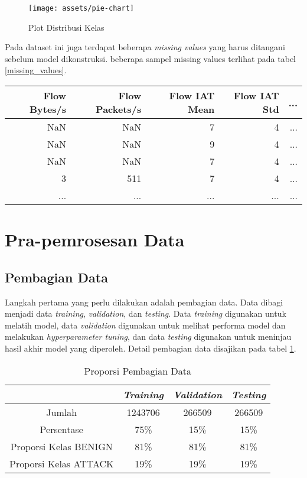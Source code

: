 \documentclass[a4paper,12pt]{report}
\begin{document}
\begin{figure}[H]
	\center \texttt{[image: assets/pie-chart]}
	\caption{Plot Distribusi Kelas} 
	\label{distribusi_kelas}
\end{figure}

Pada dataset ini juga terdapat beberapa \textit{missing values} yang harus ditangani sebelum model dikonstruksi. beberapa sampel missing values terlihat pada tabel \ref{missing_values}.
\begin{table}[h!]
	\centering
	\caption{Sampel data aktivitas jaringan}
	\label{missing_values}
	\begin{longtable}{|r|r|r|r|r|}
		\hline
		Flow Bytes/s & Flow Packets/s  & Flow IAT Mean & Flow IAT Std & ... \\
		\hline
		NaN& NaN & 7 & 4 & ...  \\
		\hline
		NaN & NaN & 9 & 4 & ...  \\
		\hline
		NaN & NaN & 7 & 4 & ... \\
		\hline
		3 & 511 & 7 & 4 & ... \\
		\hline
		... & ... & ... & ... & ... \\
		\hline
	\end{longtable}
\end{table}

\section{Pra-pemrosesan Data}
\subsection{Pembagian Data}
Langkah pertama yang perlu dilakukan adalah pembagian data. Data dibagi menjadi data \textit{training}, \textit{validation}, dan \textit{testing}. Data \textit{training} digunakan untuk melatih model, data \textit{validation} digunakan untuk melihat performa model dan melakukan \textit{hyperparameter tuning}, dan data \textit{testing} digunakan untuk meninjau hasil akhir model yang diperoleh. Detail pembagian data disajikan pada tabel \ref{pembagian_data}. 

\begin{table}[h!]
	\centering
	\caption{Proporsi Pembagian Data}
	\label{pembagian_data}
	\begin{tabular}{|c|c|c|c|}
		\hline
		& \textit{Training} & \textit{Validation} & \textit{Testing} \\
		\hline
		Jumlah & 1243706 & 266509 & 266509 \\
		\hline
		Persentase & 75\% & 15\% & 15\% \\
		\hline
		Proporsi Kelas BENIGN & 81\% & 81\% & 81\% \\
		\hline
		Proporsi Kelas ATTACK & 19\% & 19\% & 19\% \\
		\hline
	\end{tabular}
\end{table}
\end{document}
